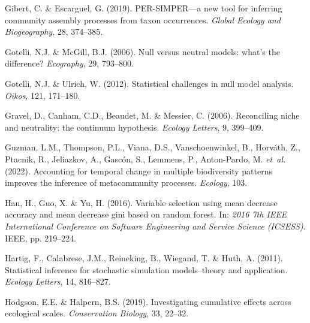 \begin{thebibliography}{70}
	Gibert, C. \& Escarguel, G. (2019).
	\newblock PER-SIMPER—a new tool for inferring community assembly processes
	from taxon occurrences.
	\newblock \emph{Global Ecology and Biogeography}, 28, 374--385.
	
	Gotelli, N.J. \& McGill, B.J. (2006).
	\newblock Null versus neutral models: what's the difference?
	\newblock \emph{Ecography}, 29, 793--800.
	
	Gotelli, N.J. \& Ulrich, W. (2012).
	\newblock Statistical challenges in null model analysis.
	\newblock \emph{Oikos}, 121, 171--180.
	
	Gravel, D., Canham, C.D., Beaudet, M. \& Messier, C. (2006).
	\newblock Reconciling niche and neutrality: the continuum hypothesis.
	\newblock \emph{Ecology Letters}, 9, 399--409.
	
	Guzman, L.M., Thompson, P.L., Viana, D.S., Vanschoenwinkel, B., Horv{\'a}th,
	Z., Ptacnik, R., Jeliazkov, A., Gasc{\'o}n, S., Lemmens, P., Anton-Pardo, M.
	\emph{et~al.} (2022).
	\newblock Accounting for temporal change in multiple biodiversity patterns
	improves the inference of metacommunity processes.
	\newblock \emph{Ecology}, 103.
	
	Han, H., Guo, X. \& Yu, H. (2016).
	\newblock Variable selection using mean decrease accuracy and mean decrease
	gini based on random forest.
	\newblock In: \emph{2016 7th IEEE International Conference on Software
		Engineering and Service Science (ICSESS)}. IEEE, pp. 219--224.
	
	Hartig, F., Calabrese, J.M., Reineking, B., Wiegand, T. \& Huth, A. (2011).
	\newblock Statistical inference for stochastic simulation models--theory and
	application.
	\newblock \emph{Ecology Letters}, 14, 816--827.
	
	Hodgson, E.E. \& Halpern, B.S. (2019).
	\newblock Investigating cumulative effects across ecological scales.
	\newblock \emph{Conservation Biology}, 33, 22--32.
	

\end{thebibliography}
